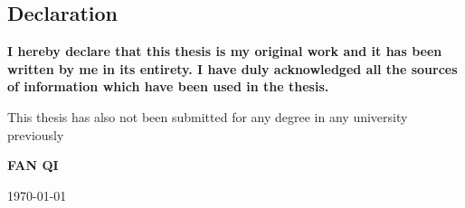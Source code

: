 \begin{dedication}
\section*{Declaration}
{\bf
I hereby declare that this thesis is my original work and it has been written by me in its entirety. I have duly acknowledged all the sources of information which have been used in the thesis. 

This thesis has also not been submitted for any degree in any university previously
}



\vspace*{50mm}
{\bf FAN QI

\today }


\end{dedication}